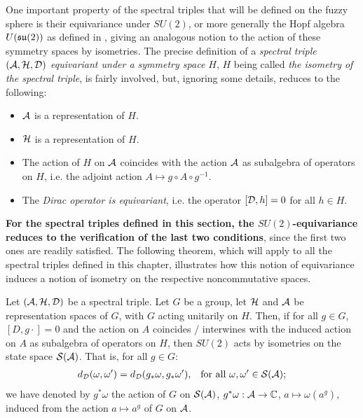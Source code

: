 One important property of the spectral triples that will be defined on the fuzzy sphere is their equivariance under $SU(2)$, or more generally the Hopf algebra $U(\mathfrak{su}(2))$ as defined in \cite{Sitarz}, giving an analogous notion to the action of these symmetry spaces by isometries. The precise definition of a \textit{spectral triple $(\mathcal A, \mathcal H, \mathcal D)$ equivariant under a symmetry space $H$}, $H$ being called \textit{the isometry of the spectral triple}, is fairly involved, but, ignoring some details, reduces to the following:
    \begin{itemize}
    
    \item $\mathcal A$ is a representation of $H$.
    
    \item $\mathcal H $ is a representation of $H$.
    
    \item The action of $H$ on $\mathcal A$ coincides with the action $\mathcal A$ as subalgebra of operators on $H$, i.e. the adjoint action $A \mapsto g \circ A \circ g^{-1}$. %
    
    \item The \textit{Dirac operator is equivariant}, i.e. the operator $[\mathcal D, h] = 0$ for all $h \in H$.
    
    \end{itemize}

\textbf{For the spectral triples defined in this section, the $SU(2)$-equivariance reduces to the verification of the last two conditions}, since the first two ones are readily satisfied. The following theorem, which will apply to all the spectral triples defined in this chapter, illustrates how this notion of equivariance induces a notion of isometry on the respective noncommutative spaces.

\begin{theorem} \label{theoGInvariantDistance}
Let $(\mathcal A, \mathcal H, \mathcal D)$ be a spectral triple. Let $G$ be a group, let $\mathcal H$ and $\mathcal A$ be representation spaces of $G$, with $G$ acting unitarily on $H$. Then, if for all $g \in G$, $[D, g\cdot] = 0$ and the action on $A$ coincides / interwines with the induced action on $A$ as subalgebra of operators on $H$, then $SU(2)$ acts by isometries on the state space $\mathcal S(\mathcal A)$. That is, for all $g \in G$:
\begin{align}
    d_\mathcal D(\omega, \omega') &= d_\mathcal D(g_* \omega, g_*\omega'), & \text{for all $\omega, \omega' \in \mathcal S(\mathcal A)$};
\end{align}
we have denoted by $g^*\omega$ the action of $G$ on $\mathcal S(\mathcal A)$, $g^* \omega: \mathcal A \to \mathbb{C}$, $a \mapsto \omega(a^g)$, induced from the action $a \mapsto a^g$ of $G$ on $\mathcal A$.
\end{theorem}


